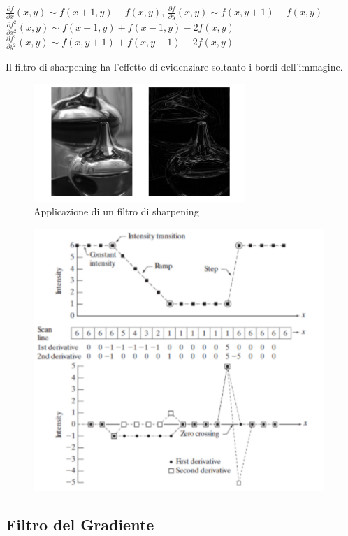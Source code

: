 \begin{center}
    $\frac{\partial{f}}{\partial{x}}(x,y) \sim f(x+1, y) - f(x, y)$,
    $\frac{\partial{f}}{\partial{y}}(x,y) \sim f(x,y+1) - f(x,y)$ \\
    $\frac{\partial{f^2}}{\partial{x^2}}(x,y) \sim f(x+1,y) + f(x-1, y) -
        2f(x,y)$ \\
    $\frac{\partial{f^2}}{\partial{y^2}}(x,y) \sim f(x,y+1) + f(x, y-1) -
        2f(x,y)$
\end{center}

Il filtro di sharpening ha l'effetto di evidenziare soltanto i bordi
dell'immagine.
\begin{figure}[H]
    \centering
    \includegraphics[width=8cm, keepaspectratio]{capitoli/immagini/imgs/sharpening.png}
    \caption{Applicazione di un filtro di sharpening}
\end{figure}

\begin{figure}[H]
    \centering
    \includegraphics[width=11cm, keepaspectratio]{capitoli/immagini/imgs/sharpering2.png}
\end{figure}

\subsection{Filtro del Gradiente}


